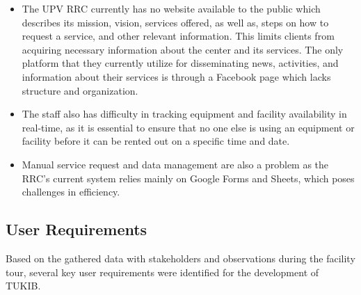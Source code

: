 \begin{itemize}
	\item The UPV RRC currently has no website available to the public which describes its mission, vision, services offered, as well as, steps on how to request a service, and other relevant information.   This limits clients from acquiring necessary information about the center and its services. The only platform that they currently utilize for disseminating news, activities, and information about their services is through a Facebook page which lacks structure and organization.
	\item The staff also has difficulty in tracking equipment and facility availability in real-time, as it is essential to ensure that no one else is using an equipment or facility before it can be rented out on a specific time and date.
	\item Manual service request and data management are also a problem as the RRC’s current system relies mainly on Google Forms and Sheets, which poses challenges in efficiency.
\end{itemize}

\subsection{User Requirements}

Based on the gathered data with stakeholders and observations during the facility tour, several key user requirements were identified for the development of TUKIB. 

